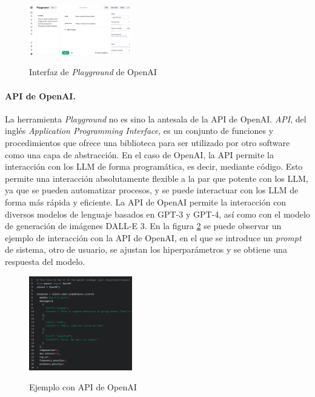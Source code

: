         \begin{figure}[h]
            \caption[Interfaz de \textit{Playground} de OpenAI]{Interfaz de \textit{Playground} de OpenAI}
            \centering
            \includegraphics[width=0.4\textwidth]{./figuras/interfaz_playground.png}
            \label{fig:playground}
        \end{figure}

        \paragraph{API de OpenAI.} La herramienta \textit{Playground} no es sino la antesala de la API de OpenAI. \textit{API}, del inglés \textit{Application Programming Interface}, es un conjunto de funciones y procedimientos que ofrece una biblioteca para ser utilizado por otro software como una capa de abstracción. En el caso de OpenAI, la API permite la interacción con los LLM de forma programática, es decir, mediante código. Esto permite una interacción absolutamente flexible a la par que potente con los LLM, ya que se pueden automatizar procesos, y se puede interactuar con los LLM de forma más rápida y eficiente. La API de OpenAI permite la interacción con diversos modelos de lenguaje basados en GPT-3 y GPT-4, así como con el modelo de generación de imágenes DALL-E 3. En la figura \ref{fig:api} se puede observar un ejemplo de interacción con la API de OpenAI, en el que se introduce un \textit{prompt} de sistema, otro de usuario, se ajustan los hiperparámetros y se obtiene una respuesta del modelo.

        \begin{figure}[h]
            \caption[Ejemplo con API de OpenAI]{Ejemplo con API de OpenAI}
            \centering
            \includegraphics[width=0.4\textwidth]{./figuras/ejemplo_API.png}
            \label{fig:api}
        \end{figure}

